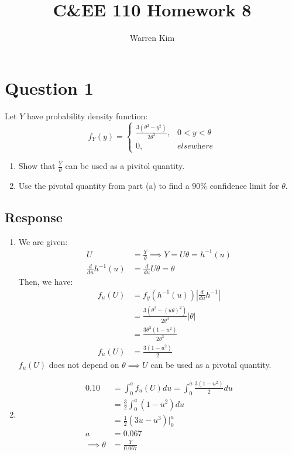 \documentclass[13pt]{article}
\title{C\&EE 110 Homework 8}
\author{Warren Kim}
\begin{document}
\maketitle

\newpage
\section*{Question 1}
Let $Y$ have probability density function:
$$ f_Y(y) =
\begin{cases}
  \frac{3(\theta^2 - y^2)}{2\theta^3}, & 0 < y < \theta \\
  0, & \textit{elsewhere}
\end{cases} $$
\begin{enumerate}[label=(\alph*)]
\item Show that $\frac{Y}{\theta}$ can be used as a pivitol quantity.
\item Use the pivotal quantity from part (a) to find a $90\%$ confidence limit for $\theta$.
\end{enumerate}

\subsection*{Response}
\begin{enumerate}[label=(\alph*)]
\item
  We are given:
  \begin{align*}
    U &= \frac{Y}{\theta} \implies Y = U\theta = h^{-1}(u) \\
    \frac{d}{du} h^{-1}(u) &= \frac{d}{du} U\theta = \theta
  \end{align*}
  Then, we have:
  \begin{align*}
    f_u(U) &= f_y\left(h^{-1}(u)\right) \left|\frac{d}{du} h^{-1}\right| \\
           &= \frac{3(\theta^2 - \left(u\theta\right)^2)}{2\theta^3} \left|\theta\right| \\
           &= \frac{3\theta^3(1 - u^2)}{2\theta^3} \\
    f_u(U) &= \frac{3(1 - u^2)}{2}
  \end{align*}
  $f_u(U)$ does not depend on $\theta \implies U$ can be used as a pivotal quantity.
  
\item
  \begin{align*}
    0.10 &= \int_0^a f_u(U)du = \int_0^a \frac{3(1 - u^2)}{2} du \\
         &= \frac{3}{2} \int_0^a (1 - u^2) du \\
         &= \frac{1}{2}\left(3u - u^3\right) \bigg|_0^a \\
    a &= 0.067 \\
         \implies \theta &= \frac{Y}{0.067}
  \end{align*}  
\end{enumerate}
\end{document}
